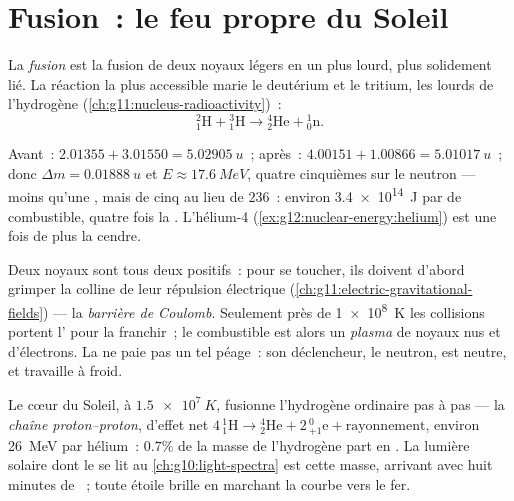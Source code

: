 \section{Fusion~: le feu propre du Soleil}

\begin{definition}[Fusion]\label{def:g12:nuclear-energy:fusion}
La \emph{fusion} est la fusion de deux noyaux légers en
un plus lourd, plus solidement lié. La réaction la plus accessible
marie le deutérium et le tritium, les
 lourds de l'hydrogène
(\cref{ch:g11:nucleus-radioactivity})~:
\[
{}^{2}_{1}\mathrm{H} + {}^{3}_{1}\mathrm{H} \longrightarrow
{}^{4}_{2}\mathrm{He} + {}^{1}_{0}\mathrm{n}.
\]
\end{definition}

\begin{example}[D--T, pesé]\label{ex:g12:nuclear-energy:dt}
Avant~: $2.01355 + 3.01550 = \qty{5.02905}{u}$~; après~:
$4.00151 + 1.00866 = \qty{5.01017}{u}$~; donc $\Delta m =
\qty{0.01888}{u}$ et $E \approx \qty{17.6}{MeV}$, quatre cinquièmes
sur le neutron --- moins qu'une , mais de
cinq  au lieu de $236$~: environ
\qty{3.4e14}{J} par  de combustible, quatre
fois la . L'hélium-4
(\cref{ex:g12:nuclear-energy:helium}) est une fois de plus la cendre.
\end{example}

\begin{definition}\label{def:g12:nuclear-energy:barrier}
Deux noyaux sont tous deux positifs~: pour se toucher, ils doivent
d'abord grimper la colline de leur répulsion électrique
(\cref{ch:g11:electric-gravitational-fields}) --- la \emph{barrière de
Coulomb}. Seulement près de \qty{1e8}{K}
les collisions portent l' pour la
franchir~; le combustible est alors un \emph{plasma} de
noyaux nus et d'électrons. La  ne paie pas un
tel péage~: son déclencheur, le neutron, est neutre, et
travaille à froid.
\end{definition}

\begin{example}\label{ex:g12:nuclear-energy:sun}
Le cœur du Soleil, à $\qty{1.5e7}{K}$,
fusionne l'hydrogène ordinaire pas à pas --- la
\emph{chaîne proton--proton}, d'effet net
$4\,{}^{1}_{1}\mathrm{H} \to {}^{4}_{2}\mathrm{He} + 2\,{}^{0}_{+1}\mathrm{e}
+ \text{rayonnement}$, environ \qty{26}{MeV} par hélium~: $0.7\%$ de
la masse de l'hydrogène part en . La lumière
solaire dont le  se lit au
\cref{ch:g10:light-spectra} est cette masse, arrivant avec huit
minutes de ~; toute étoile brille en marchant la courbe vers le
fer.
\end{example}

